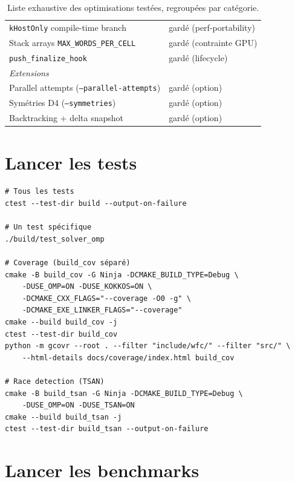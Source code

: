 \begin{table}[H]
\begin{tabularx}{\textwidth}{Xl}
\texttt{kHostOnly} compile-time branch & gardé (perf-portability) \\
Stack arrays \texttt{MAX\_WORDS\_PER\_CELL} & gardé (contrainte GPU) \\
\texttt{push\_finalize\_hook} & gardé (lifecycle) \\
\midrule
\multicolumn{2}{l}{\textit{Extensions}} \\
Parallel attempts (\texttt{--parallel-attempts}) & gardé (option) \\
Symétries D4 (\texttt{--symmetries}) & gardé (option) \\
Backtracking + delta snapshot & gardé (option) \\
\bottomrule
\end{tabularx}
\caption{Liste exhaustive des optimisations testées, regroupées par catégorie.}
\label{tab:annexes:optims}
\end{table}

\section{Lancer les tests}
\label{sec:annexes:tests}

\begin{verbatim}
# Tous les tests
ctest --test-dir build --output-on-failure

# Un test spécifique
./build/test_solver_omp

# Coverage (build_cov séparé)
cmake -B build_cov -G Ninja -DCMAKE_BUILD_TYPE=Debug \
    -DUSE_OMP=ON -DUSE_KOKKOS=ON \
    -DCMAKE_CXX_FLAGS="--coverage -O0 -g" \
    -DCMAKE_EXE_LINKER_FLAGS="--coverage"
cmake --build build_cov -j
ctest --test-dir build_cov
python -m gcovr --root . --filter "include/wfc/" --filter "src/" \
    --html-details docs/coverage/index.html build_cov

# Race detection (TSAN)
cmake -B build_tsan -G Ninja -DCMAKE_BUILD_TYPE=Debug \
    -DUSE_OMP=ON -DUSE_TSAN=ON
cmake --build build_tsan -j
ctest --test-dir build_tsan --output-on-failure
\end{verbatim}

\section{Lancer les benchmarks}
\label{sec:annexes:bench}

